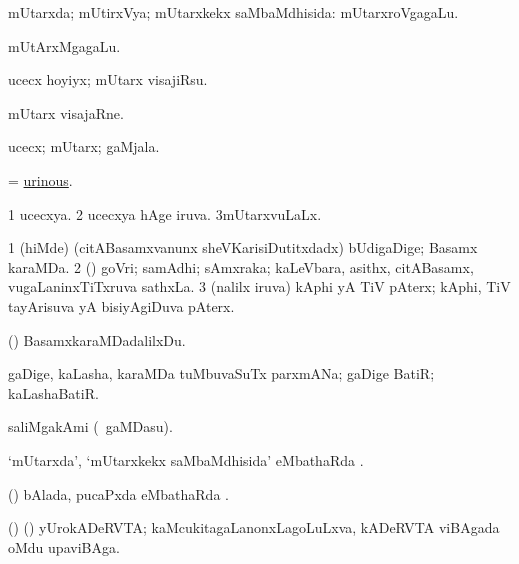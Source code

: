 \bentry
{} 
\gl{\gu}
\expl{}
\bmng
mUtarxda; mUtirxVya; mUtarxkekx saMbaMdhisida:  mUtarxroVgagaLu. 
\emng

\noindent 
\gl{\pagu}
\expl{}
\bmng
{} mUtArxMgagaLu. 
\emng
\eentry

\bentry
{} 
\gl{\akirx}
\expl{}
\bmng
ucecx hoyiyx; mUtarx visajiRsu. 
\emng
\eentry

\bentry
{} 
\gl{\nA}
\expl{}
\bmng
mUtarx visajaRne. 
\emng
\eentry

\bentry
{} 
\gl{\nA}
\expl{}
\bmng
ucecx; mUtarx; gaMjala. 
\emng
\eentry

\bentry
{} 
\gl{\gu}
\expl{}
\bmng
= \hyperlink{urinous}{urinous}. 
\emng
\eentry

\bentry
{} 
\gl{\gu}
\expl{}
\bmng
\bnum
\num{1} ucecxya. 
\num{2} ucecxya hAge iruva. 
\num{3}mUtarxvuLaLx. 
\enum
\emng
\eentry

{} 
\gl{\nA}
\expl{}
\bmng
\bnum
\num{1} (hiMde) (citABasamxvanunx sheVKarisiDutitxdadx) bUdigaDige; Basamx karaMDa.  
\num{2} (\kAparx) goVri; samAdhi; sAmxraka; kaLeVbara, asithx, citABasamx, \mo vugaLaninxTiTxruva sathxLa. 
\num{3} (nalilx iruva) kAphi yA TiV pAterx; kAphi, TiV tayArisuva yA bisiyAgiDuva pAterx. 
\enum
\emng
\eentry

\bentry
{} 
\gl{\sakirx}
\expl{}
\bmng
(\pArxparx) BasamxkaraMDadalilxDu. 
\emng
\eentry

\bentry
{} 
\gl{\nA}
\bmng
gaDige, kaLasha, karaMDa tuMbuvaSuTx parxmANa; gaDige BatiR; kaLashaBatiR. 
\emng
\eentry

\bentry
{} 
\gl{\nA}
\expl{}
\bmng
saliMgakAmi (\sA\ gaMDasu). 
\emng
\eentry

\bentry
{} 
\gl{\sapUpa}
\expl{}
\bmng
`mUtarxda', `mUtarxkekx saMbaMdhisida' eMbathaRda \sapUpa. 
\emng
\eentry

\bentry
{} 
\gl{\sapUpa}
\expl{}
\bmng
(\pArxvi) bAlada, pucaPxda eMbathaRda \sapUpa. 
\emng
\eentry

\bentry
{} 
\gl{\nA}
\expl{}
\bmng
(\bava) (\pArxvi) yUrokADeRVTA; kaMcukitagaLanonxLagoLuLxva, kADeRVTA viBAgada oMdu upaviBAga. 
\emng
\eentry

